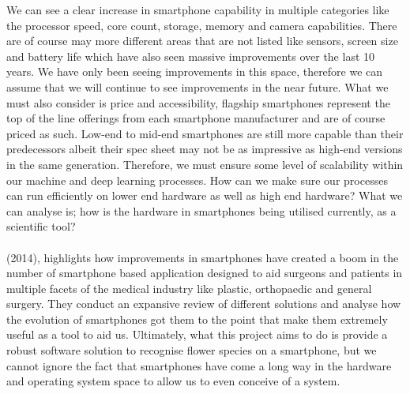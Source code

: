 \documentclass{article}
\begin{document}
\break
We can see a clear increase in smartphone capability in multiple categories like the processor speed, core count, 
storage, memory and camera capabilities. There are of course may more different areas that are not listed like sensors, 
screen size and battery life which have also seen massive improvements over the last 10 years. We have only been seeing 
improvements in this space, therefore we can assume that we will continue to see improvements in the near future. 
What we must also consider is price and accessibility, flagship smartphones represent the top of the line offerings from
 each smartphone manufacturer and are of course priced as such. Low-end to mid-end smartphones are still more capable 
 than their predecessors albeit their spec sheet may not be as impressive as high-end versions in the same generation. 
 Therefore, we must ensure some level of scalability within our machine and deep learning processes. How can we make 
 sure our processes can run efficiently on lower end hardware as well as high end hardware? What we can analyse is; how 
 is the hardware in smartphones being utilised currently, as a scientific tool?
\\
\\
 \citeauthor{kulendran2014} (2014), highlights how improvements in smartphones have created a boom in the number of 
 smartphone based application designed to aid surgeons and patients in multiple facets of the medical industry like 
  plastic, orthopaedic
   and general surgery. They conduct an expansive review of different solutions and analyse how the evolution of 
   smartphones got them to the point that make them extremely useful as a tool to aid us. Ultimately, what this project 
   aims to do is provide a robust software solution to recognise flower species on a smartphone, but we cannot ignore 
   the fact that smartphones have come a long way in the hardware and operating system space to allow us to even 
   conceive of a system.
\end{document}
